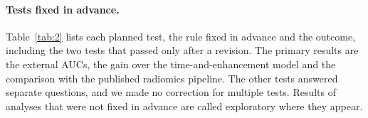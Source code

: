 \paragraph*{Tests fixed in advance.} Table~\ref{tab:2} lists each planned test, the rule fixed in advance and the
outcome, including the two tests that passed only after a revision. The primary results are the external AUCs, the
gain over the time-and-enhancement model and the comparison with the published radiomics pipeline. The other tests
answered separate questions, and we made no correction for multiple tests. Results of analyses that were not fixed in
advance are called exploratory where they appear.

